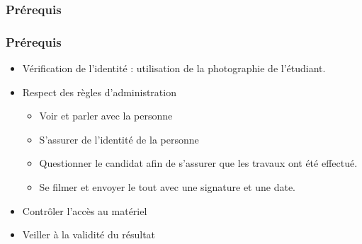 \documentclass[aspectratio=169]{beamer}
\begin{document}
		\subsubsection{Prérequis} 
				\begin{frame}
					\frametitle{Prérequis}
				 	
				 	\begin {itemize}
						\item Vérification de l’identité : utilisation de la photographie de l’étudiant.
						\item Respect des règles d’administration
							\begin {itemize}
								\item Voir et parler avec la personne
								\item S’assurer de l’identité de la personne
								\item Questionner le candidat afin de s’assurer que les travaux ont été effectué.
								\item Se filmer et envoyer le tout avec une signature et une date.
							\end{itemize}
						\item Contrôler l’accès au matériel
						\item Veiller à la validité du résultat
					\end{itemize}
				\end{frame}
				
\end{document}
